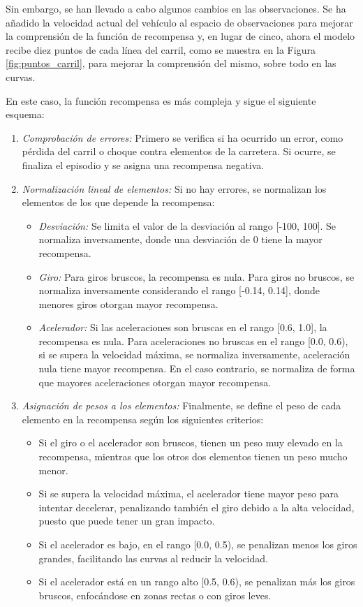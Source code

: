 Sin embargo, se han llevado a cabo algunos cambios en las observaciones. Se ha añadido la velocidad actual del vehículo al espacio de observaciones para mejorar la comprensión de la función de recompensa y, en lugar de cinco, ahora el modelo recibe diez puntos de cada línea del carril, como se muestra en la Figura \ref{fig:puntos_carril}, para mejorar la comprensión del mismo, sobre todo en las curvas.

En este caso, la función recompensa es más compleja y sigue el siguiente esquema:
\begin{enumerate}
    \item \textit{Comprobación de errores:} Primero se verifica si ha ocurrido un error, como pérdida del carril o choque contra elementos de la carretera. Si ocurre, se finaliza el episodio y se asigna una recompensa negativa.

    \item \textit{Normalización lineal de elementos:} Si no hay errores, se normalizan los elementos de los que depende la recompensa:
    \begin{itemize}
        \item \textit{Desviación:} Se limita el valor de la desviación al rango [-100, 100]. Se normaliza inversamente, donde una desviación de 0 tiene la mayor recompensa.
        \item \textit{Giro:} Para giros bruscos, la recompensa es nula. Para giros no bruscos, se normaliza inversamente considerando el rango [-0.14, 0.14], donde menores giros otorgan mayor recompensa.
        \item \textit{Acelerador:} Si las aceleraciones son bruscas en el rango [0.6, 1.0], la recompensa es nula. Para aceleraciones no bruscas en el rango [0.0, 0.6), si se supera la velocidad máxima, se normaliza inversamente, aceleración nula tiene mayor recompensa. En el caso contrario, se normaliza de forma que mayores aceleraciones otorgan mayor recompensa.
    \end{itemize}

    \item \textit{Asignación de pesos a los elementos:} Finalmente, se define el peso de cada elemento en la recompensa según los siguientes criterios:
    \begin{itemize}
        \item Si el giro o el acelerador son bruscos, tienen un peso muy elevado en la recompensa, mientras que los otros dos elementos tienen un peso mucho menor.
        \item Si se supera la velocidad máxima, el acelerador tiene mayor peso para intentar decelerar, penalizando también el giro debido a la alta velocidad, puesto que puede tener un gran impacto.
        \item Si el acelerador es bajo, en el rango [0.0, 0.5), se penalizan menos los giros grandes, facilitando las curvas al reducir la velocidad.
        \item Si el acelerador está en un rango alto [0.5, 0.6), se penalizan más los giros bruscos, enfocándose en zonas rectas o con giros leves.
    \end{itemize}
\end{enumerate}

